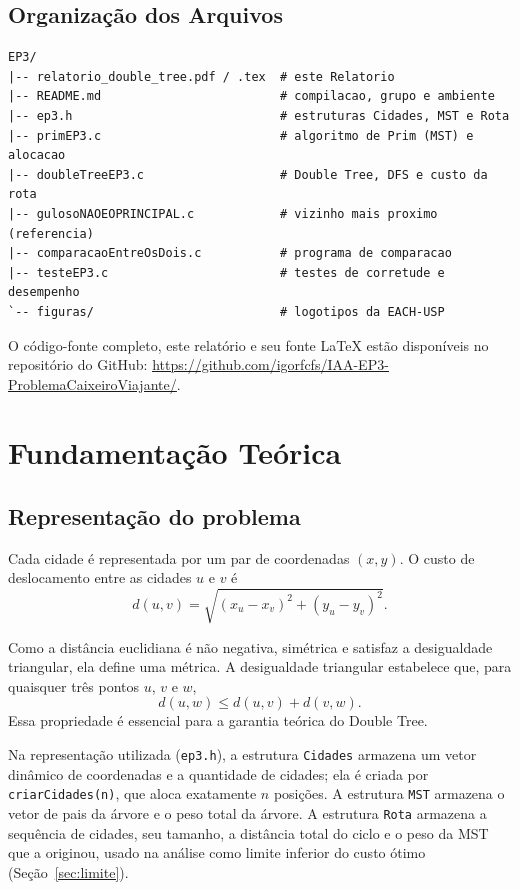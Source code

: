 \documentclass[11pt,a4paper]{article}
\newcommand{\segurl}[1]{\underline{\vphantom{Ag}#1}\hspace{0pt}}
\newcommand{\urlRepo}{\href{https://github.com/igorfcfs/IAA-EP3-ProblemaCaixeiroViajante/}{\ttfamily\color{linkblue}\segurl{https://github.com/}\allowbreak\segurl{igorfcfs/}\allowbreak\segurl{IAA-EP3-ProblemaCaixeiroViajante/}}}
\renewcommand{\_}{\underscoreoriginal\allowbreak}
\begin{document}
\subsection{Organização dos Arquivos}

\begin{lstlisting}
EP3/
|-- relatorio_double_tree.pdf / .tex  # este Relatorio
|-- README.md                         # compilacao, grupo e ambiente
|-- ep3.h                             # estruturas Cidades, MST e Rota
|-- primEP3.c                         # algoritmo de Prim (MST) e alocacao
|-- doubleTreeEP3.c                   # Double Tree, DFS e custo da rota
|-- gulosoNAOEOPRINCIPAL.c            # vizinho mais proximo (referencia)
|-- comparacaoEntreOsDois.c           # programa de comparacao
|-- testeEP3.c                        # testes de corretude e desempenho
`-- figuras/                          # logotipos da EACH-USP
\end{lstlisting}

O código-fonte completo, este relatório e seu fonte \LaTeX{} estão
disponíveis no repositório do GitHub: \urlRepo.

\section{Fundamentação Teórica}

\subsection{Representação do problema}
\label{sec:representacao}

Cada cidade é representada por um par de coordenadas $(x,y)$. O custo
de deslocamento entre as cidades $u$ e $v$ é
\[
  d(u,v)=\sqrt{(x_u-x_v)^2+(y_u-y_v)^2}.
\]

Como a distância euclidiana é não negativa, simétrica e satisfaz a
desigualdade triangular, ela define uma métrica. A desigualdade
triangular estabelece que, para quaisquer três pontos $u$, $v$ e $w$,
\[
  d(u,w)\leq d(u,v)+d(v,w).
\]
Essa propriedade é essencial para a garantia teórica do Double Tree.

Na representação utilizada (\texttt{ep3.h}), a estrutura
\texttt{Cidades} armazena um vetor dinâmico de coordenadas e a
quantidade de cidades; ela é criada por \texttt{criarCidades(n)}, que
aloca exatamente $n$ posições. A estrutura \texttt{MST} armazena o vetor
de pais da árvore e o peso total da árvore. A estrutura \texttt{Rota}
armazena a sequência de cidades, seu tamanho, a distância total do ciclo
e o peso da MST que a originou, usado na análise como limite inferior
do custo ótimo (Seção~\ref{sec:limite}).
\end{document}
